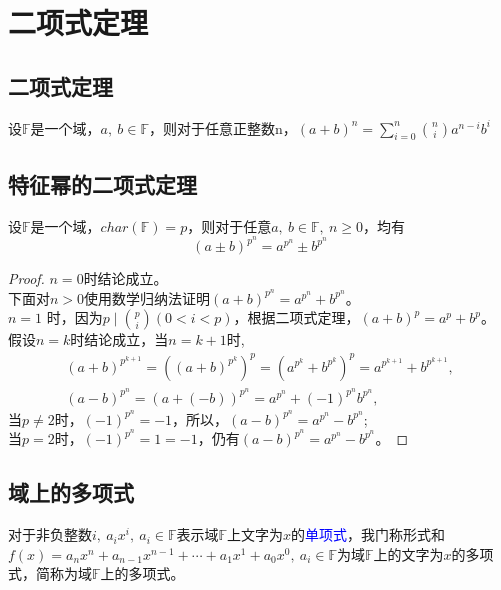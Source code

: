 \documentclass[cn,10pt]{elegantbook}
\begin{document}
\section{二项式定理}
\subsection{二项式定理}
\begin{theorem}[二项式定理]
  设$\mathbb{F}$是一个域，$a,\ b \in \mathbb{F}$，则对于任意正整数n，$(a+b)^n = \sum_{i=0}^{n} \binom{n}{i}a^{n-i}b^i$
\end{theorem}
\subsection{特征幂的二项式定理}
\begin{theorem}
  设$\mathbb{F}$是一个域，$char(\mathbb{F})=p$，则对于任意$a,\ b \in \mathbb{F},\ n \geq 0$，均有
  \begin{equation*}
    (a \pm b)^{p^n} = a^{p^n} \pm b^{p^n}
  \end{equation*}
\end{theorem}
\begin{proof}
  $n = 0$时结论成立。\\
  下面对$n>0$使用数学归纳法证明$(a+b)^{p^n} = a^{p^n}+b^{p^n}$。\\
  $n =1$ 时，因为$p \mid \binom{p}{i}(0<i<p)$，根据二项式定理，$(a+b)^p = a^p +b^p$。\\
  假设$n = k$时结论成立，当$n = k+1$时,
  \begin{align*}
    (a+b)^{p^{k+1}}=((a+b)^{p^k})^p = (a^{p^k}+b^{p^k})^p = a^{p^{k+1}}+b^{p^{k+1}},
    \\ (a-b)^{p^n} = (a+(-b))^{p^n} = a^{p^n}+(-1)^{p^n}b^{p^n},
  \end{align*}
  当$p \neq 2$时，$(-1)^{p^n} = -1$，所以，$(a-b)^{p^n} = a^{p^n} - b^{p^n}$;
  \\当$p = 2$时，$(-1)^{p^n} = 1 = -1$，仍有$(a-b)^{p^n} = a^{p^n}-b^{p^n}$。
\end{proof}
\subsection{域上的多项式}
\begin{definition}
  对于非负整数$i,\ a_ix^i,\ a_i \in \mathbb{F}$表示域$\mathbb{F}$上文字为$x$的\textcolor{blue}{单项式}，我门称形式和$f(x)=a_nx^n+a_{n-1}x^{n-1}+ \cdots + a_1x^1 + a_0x^0,\ a_i \in \mathbb{F}$为域$\mathbb{F}$上的文字为$x$的多项式，简称为域$\mathbb{F}$上的多项式。
\end{definition}
\end{document}

